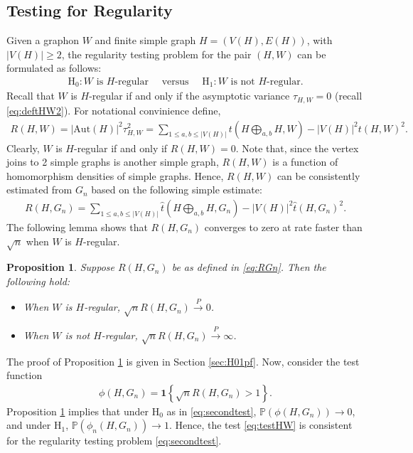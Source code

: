 \documentclass[11pt,reqno]{amsart}
\numberwithin{equation}{section}
\newtheorem{prop}{Proposition}[section]
\theoremstyle{definition}
\begin{document}
\subsection{Testing for Regularity} 
\label{sec:HWR}

Given a graphon $W$ and finite simple graph $H = (V(H), E(H))$, with $|V(H)| \geq 2$, the regularity testing problem for the pair $(H, W)$ can be formulated as follows: 
\begin{align}\label{eq:secondtest}
	\mathrm{H}_{0} :W \text{ is } H \text{-regular} \quad \text{ versus } \quad \mathrm{H}_{1}: W \text{ is not } H\text{-regular} . 
\end{align}
Recall that $W$ is $H$-regular if and only if the asymptotic variance $\tau_{H, W} = 0$ (recall \eqref{eq:deftHW2}). For notational convinience define, 
\begin{align}\label{eq:defRHW}
	R(H,W) = |\text{Aut}(H)|^2 \tau_{H,W}^2 = \sum_{1\leq a,b\leq |V(H)|}t\left(H\bigoplus_{a,b}H,W\right)-|V(H)|^2t(H,W)^2 . 
\end{align}
Clearly, $W$ is $H$-regular if and only if $R(H,W) = 0$. Note that, since the vertex joins to 2 simple graphs is another simple graph, $R(H,W)$ is a function of homomorphism densities of simple graphs. 
Hence,  $R(H,W)$  can be consistently estimated from $G_n$ based on the following simple estimate: 
\begin{align}\label{eq:RGn}
	R(H,G_{n})=\sum_{1\leq a,b\leq |V(H)|}\hat{t}\left(H\bigoplus_{a,b}H,G_{n}\right)-|V(H)|^2\hat{t}(H,G_{n})^2.
\end{align}
The following lemma shows that $R(H,G_{n})$ converges to zero at rate faster than $\sqrt n$ when $W$ is $H$-regular. 
\begin{prop}\label{prop:H01} Suppose $R(H,G_{n})$ be as defined in \eqref{eq:RGn}. Then the following hold: 
\begin{itemize}
 
\item[$(1)$] When $W$ is $H$-regular, $\sqrt{n}R(H,G_{n})\overset{P}{\rightarrow} 0$. 

\item[$(2)$] When $W$ is not $H$-regular, $\sqrt{n}R(H,G_{n})\overset{P}{\rightarrow} \infty$. 

\end{itemize}
\end{prop}

The proof of Proposition \ref{prop:H01} is given in Section \ref{sec:H01pf}. Now, consider the test function
\begin{align}\label{eq:testHW}
	\phi(H, G_{n})= \bm 1 \left\{\sqrt{n}R(H,G_{n})> 1 \right\} . 
\end{align} 
Proposition \ref{prop:H01} implies that under $\mathrm H_{0}$ as in \eqref{eq:secondtest}, $\mathbb{P}(\phi(H, G_{n}))\rightarrow 0$, and under $\mathrm H_{1}$, $\mathbb{P}(\phi_{n}(H,G_{n}))\rightarrow 1$. Hence, the test \eqref{eq:testHW} is consistent for the regularity testing problem \eqref{eq:secondtest}. 
\end{document}
